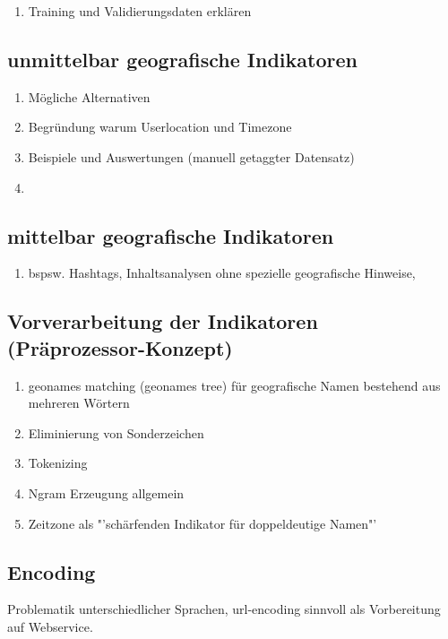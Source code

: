 	\begin{enumerate}
		\item{Training und Validierungsdaten erklären} 
	\end{enumerate}


	\subsection{unmittelbar geografische Indikatoren}
		\begin{enumerate}
			\item Mögliche Alternativen
			\item Begründung warum Userlocation und Timezone
			\item Beispiele und Auswertungen (manuell getaggter Datensatz)
			\item \cite{Hecht2011} 
		\end{enumerate}

	\subsection{mittelbar geografische Indikatoren}
		\begin{enumerate}
			\item bspsw. Hashtags, Inhaltsanalysen ohne spezielle geografische Hinweise, 
		\end{enumerate}

	
	\subsection{Vorverarbeitung der Indikatoren (Präprozessor-Konzept)}
		\begin{enumerate}
			\item geonames matching (geonames tree) für geografische Namen bestehend aus mehreren Wörtern
			\item Eliminierung von Sonderzeichen
			\item Tokenizing
			\item Ngram Erzeugung allgemein
			\item {} Zeitzone als "'schärfenden Indikator für doppeldeutige Namen"'
		\end{enumerate}

	\subsection{Encoding}
		Problematik unterschiedlicher Sprachen, 
		url-encoding sinnvoll als Vorbereitung auf Webservice. 

